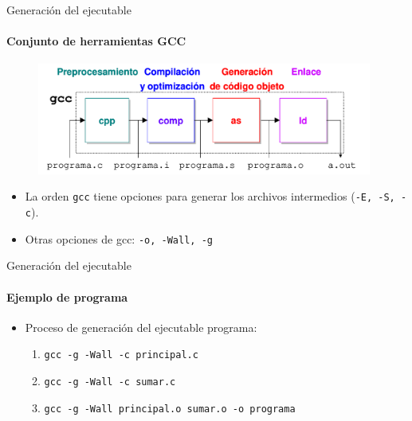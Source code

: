 \documentclass{beamer}
\begin{document}
	\begin{frame}{Generación del ejecutable}
       \framesubtitle{Conjunto de herramientas GCC}

		\begin{figure}
			\includegraphics[width=11cm, page=1]{figuras/compilacionUnix.pdf}
		\end{figure}
		
		\begin{itemize}
			\item La orden \texttt{gcc} tiene opciones para generar los archivos intermedios	  (\texttt{-E, -S, -c}).
			\item Otras opciones de gcc: \texttt{-o, -Wall, -g}
		\end{itemize}
	\end{frame}	
	
	
	\begin{frame}{Generación del ejecutable}	
       \framesubtitle{Ejemplo de programa}
\vspace{-0.8cm}
\begin{minipage}[t]{0.55\textwidth}
		
\end{minipage}		
\hspace{0.5cm}
\begin{minipage}[t]{0.4\textwidth}
		
		
\end{minipage}		
\vspace{-0.3cm}
\begin{itemize}
	\item \small{Proceso de generación del ejecutable programa:}
	\scriptsize{
	\begin{enumerate}
		\item \texttt{gcc -g -Wall -c principal.c}
		\item \texttt{gcc -g -Wall -c sumar.c}
		\item \texttt{gcc -g -Wall principal.o sumar.o -o programa}
	\end{enumerate}
}	
\end{itemize}

	\end{frame}
\end{document}
